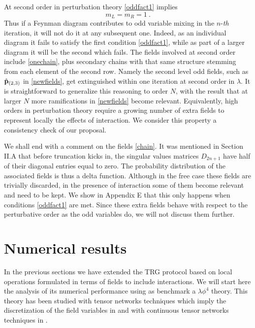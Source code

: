 \documentclass[a4paper,preprintnumbers,nofootinbib,twocolumn]{quantumarticle}
\newcommand{\be}{\begin{equation}} \newcommand{\ee}{\end{equation}}
\begin{document}
At second order in perturbation theory \eqref{oddfact1} implies
\be
m_L=m_R=1 \ .
\label{secondO}
\ee
Thus if a Feynman diagram contributes to odd variable mixing in the $n$-{\it th} iteration, it will not do it at any subsequent one.
Indeed, as an individual diagram it fails to satisfy the first condition \eqref{oddfact1}, while as part of a larger diagram it will be the second which fails.
The fields involved at second order include \eqref{onechain}, plus secondary chains with that same structure stemming from each element of the second row.
Namely the second level odd fields, such as ${\hat {\bf p}}_{(2,3)}$ in \eqref{newfields}, get extinguished within one iteration at second order in $\lambda$.
It is straightforward to generalize this reasoning to order $N$, with the result that at larger $N$ more ramifications in \eqref{newfields} become relevant.
Equivalently, high orders in perturbation theory require a growing number of extra fields to represent locally the effects of interaction. 
We consider this property a consistency check of our proposal.

We shall end with a comment on the fields \eqref{chain}. It was mentioned in Section II.A that before truncation kicks in, the singular values matrices $D_{2n+1}$ have half of their diagonal entries equal to zero.
The probability distribution of the associated fields is thus a delta function. Although in the free case these fields are trivially discarded,
in the presence of interaction some of them become relevant and need to be kept. We show in Appendix E that this only happens when conditions  \eqref{oddfact1} are met.
Since these extra fields 
behave with respect to the perturbative order as the odd variables do, 
we will not discuss them further.



\vspace*{-1.mm}


\section{Numerical results}


\vspace*{-1.mm}

In the previous sections we have extended the TRG protocol based on local operations formulated in terms of fields to include interactions.
We will start here the analysis of its numerical performance using as benchmark a $\lambda \phi^4$ theory. This theory has been studied with
tensor networks techniques which imply the discretization of the field variables in \cite{Sh12,K19,V19,D20,V21} 
and with continuous tensor networks techniques in \cite{T21a,T21b}.
\end{document}
